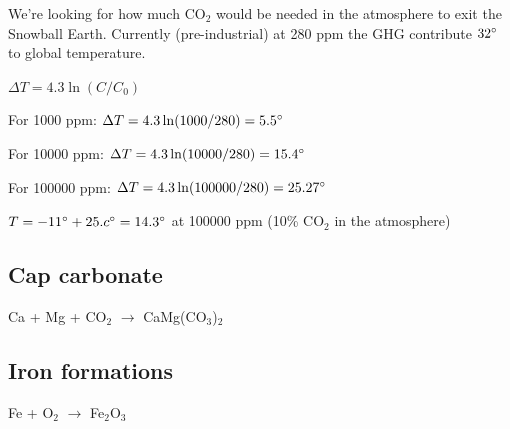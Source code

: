 We're looking for how much CO$_2$ would be needed in the atmosphere to exit
the Snowball Earth. Currently (pre-industrial) at 280 ppm the GHG contribute
$32 \degree$ to global temperature.

$\Delta T = 4.3 \ln (C/C_0)$

For 1000 ppm: $\Delta T = 4.3 \ln (1000/280) = 5.5 \degree$

For 10000 ppm: $\Delta T = 4.3 \ln (10000/280) = 15.4 \degree$

For 100000 ppm: $\Delta T = 4.3 \ln (100000/280) = 25.27 \degree$

$T = -11 \degree + 25.c \degree = 14.3 \degree$ at 100000 ppm (10\%
CO$_2$ in the atmosphere)

\subsection{Cap carbonate}

Ca + Mg + CO$_2$ $\rightarrow$ CaMg(CO$_3$)$_2$

\subsection{Iron formations}

Fe + O$_2$ $\rightarrow$ Fe$_2$O$_3$
